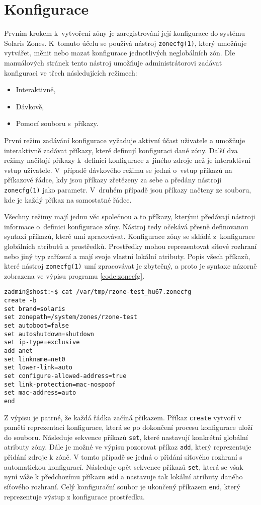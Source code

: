 \section{Konfigurace}
\label{chapter:zones:configuration}
Prvním krokem k~vytvoření zóny je zaregistrování její konfigurace do systému Solaris Zones. K~tomuto účelu se používá nástroj
\verb|zonecfg(1)|, který umožňuje vytvářet, měnit nebo mazat konfigurace jednotlivých neglobálních zón. Dle manuálových stránek 
\cite{oracle:manpages:zonecfg} tento nástroj umožňuje administrátorovi zadávat konfiguraci ve třech následujících režimech:
\begin{itemize}
 \item Interaktivně,
 \item Dávkově,
 \item Pomocí souboru s~příkazy.
\end{itemize}
První režim zadávání konfigurace vyžaduje aktivní účast uživatele a umožňuje interaktivně zadávat příkazy, které definují
konfiguraci dané zóny. Další dva režimy načítají příkazy k~definici konfigurace z~jiného zdroje než je interaktivní vstup uživatele.
V~případě dávkového režimu se jedná o~vstup příkazů na příkazové řádce, kdy jsou příkazy zřetězeny za sebe a předány nástroji
\verb|zonecfg(1)| jako parametr. V~druhém případě jsou příkazy načteny ze souboru, kde je každý příkaz na samostatné řádce.

Všechny režimy mají jednu věc společnou a to příkazy, kterými předávají nástroji informace o~definici konfigurace zóny.
Nástroj tedy očekává přesně definovanou syntaxi příkazů, které umí zpracovávat. Konfigurace zóny se skládá z~konfigurace 
globálních atributů a prostředků. Prostředky mohou reprezentovat síťové rozhraní nebo jiný typ zařízení a mají svoje vlastní
lokální atributy. Popis všech příkazů, které nástroj \verb|zonecfg(1)| umí zpracovávat je zbytečný, a proto je syntaxe
názorně zobrazena ve výpisu programu \ref{code:zonecfg}.
\begin{lstlisting}[caption={Ukázka konfigurace zóny}, float, label={code:zonecfg}]
zadmin@shost:~$ cat /var/tmp/rzone-test_hu67.zonecfg
create -b
set brand=solaris
set zonepath=/system/zones/rzone-test
set autoboot=false
set autoshutdown=shutdown
set ip-type=exclusive
add anet
set linkname=net0
set lower-link=auto
set configure-allowed-address=true
set link-protection=mac-nospoof
set mac-address=auto
end
\end{lstlisting}
Z výpisu je patrné, že každá řádka začíná příkazem. Příkaz \verb|create| vytvoří v paměti reprezentaci
konfigurace, která se po dokončení procesu konfigurace uloží do souboru. Následuje sekvence příkazů \verb|set|, které nastavují
konkrétní globální atributy zóny. Dále je možné ve výpisu pozorovat příkaz \verb|add|, který reprezentuje přidání zdroje k zóně.
V tomto případě se jedná o přidání síťového rozhraní s automatickou konfigurací. Následuje opět sekvence příkazů \verb|set|, která
se však nyní váže k předchozímu příkazu \verb|add| a nastavuje tak lokální atributy daného síťového rozhraní. Celý konfigurační
soubor je ukončený příkazem \verb|end|, který reprezentuje výstup z konfigurace prostředku.


